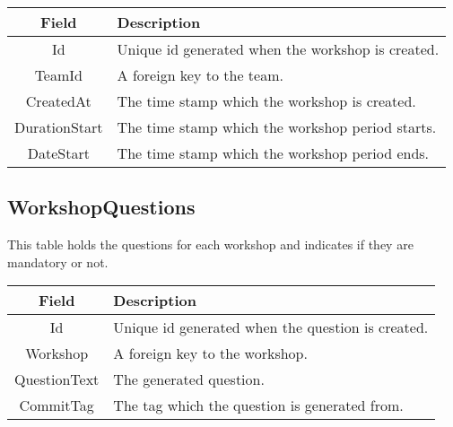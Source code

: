 \vspace{0.5cm}
\begin{tabularx}{\linewidth}{| c | X |}
    \hline
    \rowcolor[gray]{0.8}
    \textbf{Field} & \textbf{Description} \\
    \hline
    Id & Unique id generated when the workshop is created.\\ \hline
   	TeamId & A foreign key to the team.\\ \hline
   	CreatedAt & The time stamp which the workshop is created.\\ \hline
   	DurationStart & The time stamp which the workshop period starts.\\ \hline
   	DateStart & The time stamp which the workshop period ends.\\ 
    \hline
\end{tabularx}
\vspace{0.5cm}

\subsection*{WorkshopQuestions}
This table holds the questions for each workshop and indicates if they are mandatory or not. \\

\vspace{0.5cm}
\begin{tabularx}{\linewidth}{| c | X |}
    \hline
    \rowcolor[gray]{0.8}
    \textbf{Field} & \textbf{Description} \\
    \hline
    Id & Unique id generated when the question is created.\\ \hline
   	Workshop & A foreign key to the workshop.\\ \hline
   	QuestionText & The generated question.\\ \hline
   	CommitTag & The tag which the question is generated from.\\ 
    \hline
\end{tabularx}
\vspace{0.5cm}